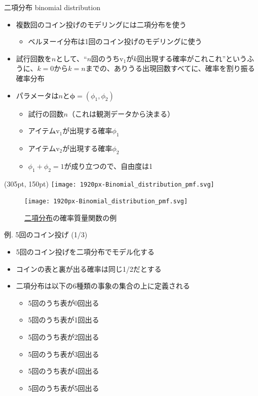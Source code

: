 \documentclass[aspectratio=169,unicode,dvipdfmx,14pt]{beamer}
\begin{document}
\begin{frame}{二項分布 binomial distribution}
\begin{itemize}
\item 複数回のコイン投げのモデリングには二項分布を使う
\begin{itemize}
\item ベルヌーイ分布は1回のコイン投げのモデリングに使う
\end{itemize}
\item 試行回数を$n$として、``$n$回のうち$\mbox{v}_1$が$k$回出現する確率がこれこれ''というふうに、$k=0$から$k=n$までの、ありうる出現回数すべてに、確率を割り振る確率分布
\item パラメータは$n$と$\bm{\phi} = (\phi_1, \phi_2)$
\begin{itemize}
\item 試行の回数$n$（これは観測データから決まる）
\item アイテム$\mbox{v}_1$が出現する確率$\phi_1$
\item アイテム$\mbox{v}_2$が出現する確率$\phi_2$
\item $\phi_1 + \phi_2=1$が成り立つので、自由度は1
\end{itemize}
\end{itemize}
\begin{textblock*}{0.4\linewidth}(305pt, 150pt)
    \centering
    \texttt{[image: 1920px-Binomial\_distribution\_pmf.svg]}
\end{textblock*}
\end{frame}

\begin{frame}
\begin{figure}[htbp]
\begin{center}
\vspace{.2in}
\texttt{[image: 1920px-Binomial\_distribution\_pmf.svg]}
\caption{\href{https://en.wikipedia.org/wiki/Binomial_distribution}{二項分布}の確率質量関数の例}
\label{}
\end{center}
\end{figure}
\end{frame}

\begin{frame}{例. 5回のコイン投げ (1/3)}
\begin{itemize}
\item 5回のコイン投げを二項分布でモデル化する
\item コインの表と裏が出る確率は同じ1/2だとする
\item 二項分布は以下の6種類の事象の集合の上に定義される
\begin{itemize}
\item 5回のうち表が0回出る
\item 5回のうち表が1回出る
\item 5回のうち表が2回出る
\item 5回のうち表が3回出る
\item 5回のうち表が4回出る
\item 5回のうち表が5回出る
\end{itemize}
\end{itemize}
\end{frame}
\end{document}
